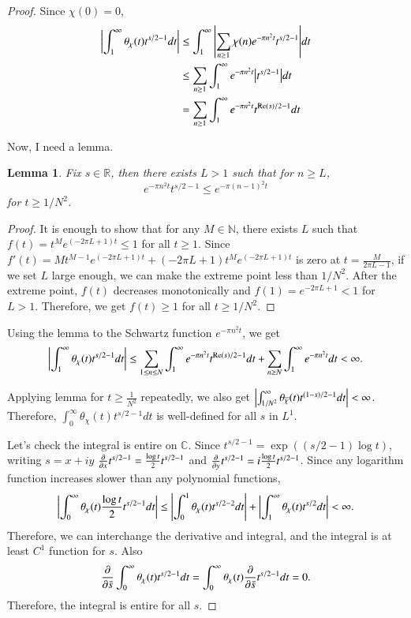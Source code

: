 \documentclass[a4paper, 12pt]{article}
\theoremstyle{Mydefinition}
\theoremstyle{Mytheorem}
\newtheorem{lemma}[statement]{Lemma}
\begin{document}
\begin{proof}
Since $\chi(0) = 0$,
\begin{equation*}
\begin{split}
    \abs{\int_1^\infty \theta_\chi(t)t^{s/2-1}dt}&\leq\int_1^\infty \abs{\sum_{n\geq 1}\chi(n)e^{-\pi n^2 t}t^{s/2-1}}dt\\
    &\leq \sum_{n\geq 1} \int_1^\infty e^{-\pi n^2 t}\abs{t^{s/2-1}}dt\\
    &=\sum_{n\geq 1} \int_1^\infty e^{-\pi n^2 t}t^{\Re(s)/2-1}dt
\end{split}
\end{equation*}

Now, I need a lemma.
\begin{lemma}
Fix $s\in\mathbb{R}$, then there exists $L>1$ such that for $n\geq L$,
\begin{equation*}
    e^{-\pi n^2 t}t^{s/2-1}\leq e^{-\pi (n-1)^2 t}
\end{equation*}
for $t\geq 1/N^2$.
\end{lemma}
\begin{proof}
It is enough to show that for any $M\in\mathbb{N}$, there exists $L$ such that $f(t)=t^M e^{(-2\pi L+1)t}\leq 1$ for all $t\geq 1$. Since $f'(t) = Mt^{M-1}e^{(-2\pi L+1)t} + (-2\pi L+1)t^M e^{(-2\pi L+1)t}$ is zero at $t=\frac{M}{2\pi L-1}$, if we set $L$ large enough, we can make the extreme point less than $1/N^2$. After the extreme point, $f(t)$ decreases monotonically and $f(1) = e^{-2\pi L+1}<1$ for $L>1$. Therefore, we get $f(t)\geq 1$ for all $t\geq 1/N^2$.
\end{proof}

Using the lemma to the Schwartz function $e^{-\pi n^2 t}$, we get
\begin{equation*}
    \abs{\int_1^\infty \theta_\chi(t)t^{s/2-1}dt}\leq \sum_{1\leq n\leq N} \int_1^\infty e^{-\pi n^2 t}t^{\Re(s)/2-1}dt+\sum_{n\geq N} \int_1^\infty e^{-\pi n^2 t}dt<\infty.
\end{equation*}

Applying lemma for $t\geq \frac{1}{N^2}$ repeatedly, we also get $\abs{\int_{1/N^2}^\infty \theta_{\overline{\chi}}(t)t^{(1-s)/2-1}dt}<\infty$. Therefore, $\int_0^\infty \theta_\chi(t)t^{s/2-1}dt$ is well-defined for all $s$ in $L^1$.

Let's check the integral is entire on $\mathbb{C}$. Since $t^{s/2-1} = \exp((s/2-1)\log t)$, writing $s= x+iy$ $\pdv{x}t^{s/2-1} = \frac{\log t}{2}t^{s/2-1}$ and $\pdv{y}t^{s/2-1} = i\frac{\log t}{2}t^{s/2-1}$. Since any logarithm function increases slower than any polynomial functions, 
\begin{equation}\label{Eq:Entire}
    \abs{\int_0^\infty \theta_\chi(t)\frac{\log t}{2}t^{s/2-1}dt}\leq \abs{\int_0^1 \theta_\chi(t)t^{s/2-2}dt} + \abs{\int_1^\infty \theta_\chi(t)t^{s/2}dt}<\infty.
\end{equation}
Therefore, we can interchange the derivative and integral, and the integral is at least $C^1$ function for $s$. Also
\begin{equation*}
    \pdv{\bar{s}}\int_0^\infty \theta_\chi(t)t^{s/2-1}dt = \int_0^\infty \theta_\chi(t)\pdv{\bar{s}}t^{s/2-1}dt = 0.
\end{equation*}
Therefore, the integral is entire for all $s$.


\end{proof}
\end{document}
